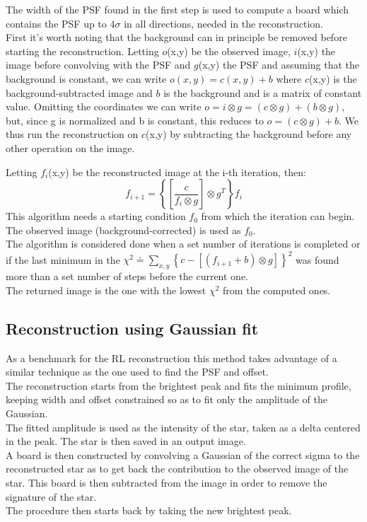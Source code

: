 \documentclass[a4paper]{article}
\begin{document}
\begin{multicols}{2}
			The width of the PSF found in the first step is used to compute a board which contains the PSF up to $4\sigma$ in all directions, needed in the reconstruction.\\
			
			First it's worth noting that the background can in principle be removed before starting the reconstruction. Letting $o$(x,y) be the observed image, $i$(x,y) the image before convolving with the PSF and $g$(x,y) the PSF and assuming that the background is constant, we can write $o(x,y) = c(x,y) + b$ where $c$(x,y) is the background-subtracted image and $b$ is the background and is a matrix of constant value. Omitting the coordinates we can write $o = i \otimes g = (c \otimes g) + (b \otimes g)$, but, since g is normalized and b is constant, this reduces to $o = (c \otimes g) + b$. We thus run the reconstruction on $c$(x,y) by subtracting the background before any other operation on the image.\\
			\newline
			
			Letting $f_i$(x,y) be the reconstructed image at the i-th iteration, then:
			\begin{equation*}
				f_{i+1} = \left\{\left[\frac{c}{f_i \otimes g}\right] \otimes g^T\right\}f_i
			\end{equation*}
			This algorithm needs a starting condition $f_0$ from which the iteration can begin. The observed image (background-corrected) is used as $f_0$.\\
			
			The algorithm is considered done when a set number of iterations is completed or if the last minimum in the $\chi^2 \doteq \sum_{x,y}\left\{c-\left[\left(f_{i+1} + b\right) \otimes g \right]\right\}^2$ was found more than a set number of steps before the current one.\\
			The returned image is the one with the lowest $\chi^2$ from the computed ones.
			
		\subsection{Reconstruction using Gaussian fit}
			As a benchmark for the RL reconstruction this method takes advantage of a similar technique as the one used to find the PSF and offset.\\
			
			The reconstruction starts from the brightest peak and fits the minimum profile, keeping width and offset constrained so as to fit only the amplitude of the Gaussian.\\
			The fitted amplitude is used as the intensity of the star, taken as a delta centered in the peak. The star is then saved in an output image.\\
			A board is then constructed by convolving a Gaussian of the correct sigma to the reconstructed star as to get back the contribution to the observed image of the star. This board is then subtracted from the image in order to remove the signature of the star.\\
			The procedure then starts back by taking the new brightest peak.\\
			

\end{multicols}
\end{document}
